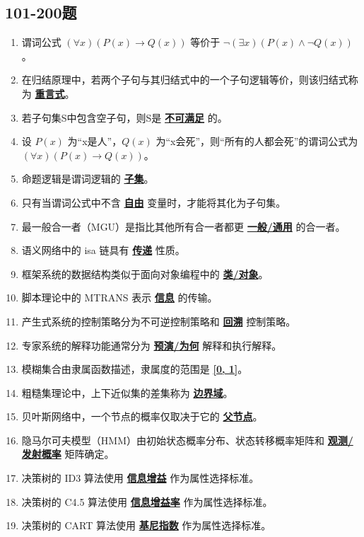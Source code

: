 \documentclass[12pt,a4paper,openany]{ctexbook}
\begin{document}
\subsection{101-200题}
\begin{enumerate}[resume,leftmargin=2em,itemsep=1pt]
\item 谓词公式 $(\forall x)(P(x) \to Q(x))$ 等价于 \underline{\textbf{$\neg (\exists x)(P(x) \land \neg Q(x))$}}。
\item 在归结原理中，若两个子句与其归结式中的一个子句逻辑等价，则该归结式称为 \underline{\textbf{重言式}}。
\item 若子句集S中包含空子句，则S是 \underline{\textbf{不可满足}} 的。
\item 设 $P(x)$ 为“x是人”，$Q(x)$ 为“x会死”，则“所有的人都会死”的谓词公式为 \underline{\textbf{$(\forall x)(P(x) \to Q(x))$}}。
\item 命题逻辑是谓词逻辑的 \underline{\textbf{子集}}。
\item 只有当谓词公式中不含 \underline{\textbf{自由}} 变量时，才能将其化为子句集。
\item 最一般合一者（MGU）是指比其他所有合一者都更 \underline{\textbf{一般/通用}} 的合一者。
\item 语义网络中的 isa 链具有 \underline{\textbf{传递}} 性质。
\item 框架系统的数据结构类似于面向对象编程中的 \underline{\textbf{类/对象}}。
\item 脚本理论中的 MTRANS 表示 \underline{\textbf{信息}} 的传输。
\item 产生式系统的控制策略分为不可逆控制策略和 \underline{\textbf{回溯}} 控制策略。
\item 专家系统的解释功能通常分为 \underline{\textbf{预演/为何}} 解释和执行解释。
\item 模糊集合由隶属函数描述，隶属度的范围是 \underline{\textbf{[0, 1]}}。
\item 粗糙集理论中，上下近似集的差集称为 \underline{\textbf{边界域}}。
\item 贝叶斯网络中，一个节点的概率仅取决于它的 \underline{\textbf{父节点}}。
\item 隐马尔可夫模型（HMM）由初始状态概率分布、状态转移概率矩阵和 \underline{\textbf{观测/发射概率}} 矩阵确定。
\item 决策树的 ID3 算法使用 \underline{\textbf{信息增益}} 作为属性选择标准。
\item 决策树的 C4.5 算法使用 \underline{\textbf{信息增益率}} 作为属性选择标准。
\item 决策树的 CART 算法使用 \underline{\textbf{基尼指数}} 作为属性选择标准。

\end{enumerate}
\end{document}
